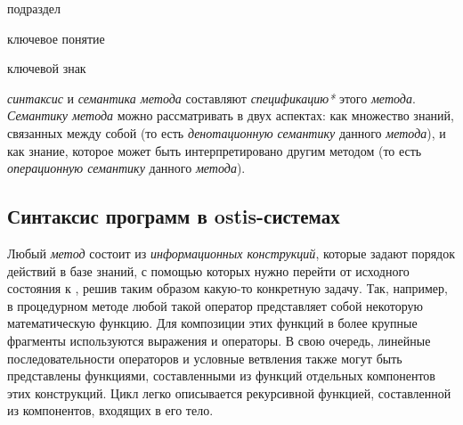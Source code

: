 \begin{SCn}
	
\begin{scnrelfromlist}{подраздел}
\end{scnrelfromlist}

\bigskip

\begin{scnrelfromlist}{ключевое понятие}
\end{scnrelfromlist}

\begin{scnrelfromlist}{ключевой знак}
\end{scnrelfromlist}
	
\end{SCn}

\textit{синтаксис} и \textit{семантика метода} составляют \textit{спецификацию*} этого \textit{метода}. \textit{Семантику метода} можно рассматривать в двух аспектах: как множество знаний, связанных между собой (то есть \textit{денотационную семантику} данного \textit{метода}), и как знание, которое может быть интерпретировано другим методом (то есть \textit{операционную семантику} данного \textit{метода}).

\subsection{Синтаксис программ в ostis-системах}
\label{sec_programs_method_syntax}

Любый \textit{метод} состоит из \textit{информационных конструкций}, которые задают порядок действий в базе знаний, с помощью которых нужно перейти от исходного состояния к , решив таким образом какую-то конкретную задачу. Так, например, в процедурном методе любой такой оператор представляет собой некоторую математическую функцию. Для композиции этих функций в более крупные фрагменты используются выражения и операторы. В свою очередь, линейные последовательности операторов и условные ветвления также могут быть представлены функциями, составленными из функций отдельных компонентов этих конструкций. Цикл легко описывается рекурсивной функцией, составленной из компонентов, входящих в его тело.

